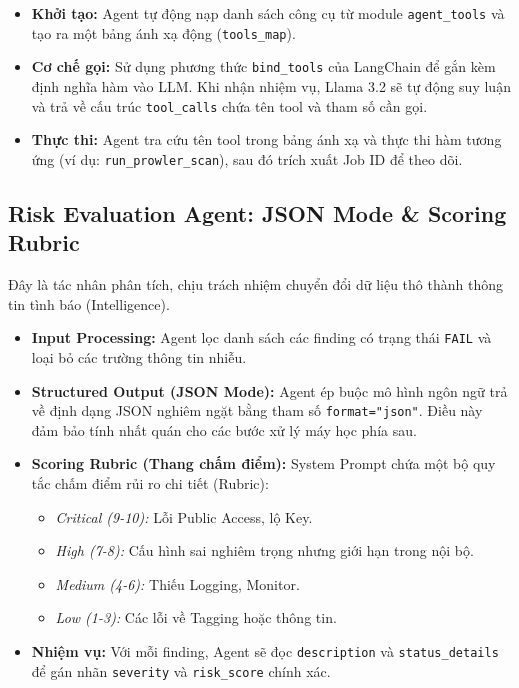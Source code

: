 \begin{itemize}
    \item \textbf{Khởi tạo:} Agent tự động nạp danh sách công cụ từ module \texttt{agent\_tools} và tạo ra một bảng ánh xạ động (\texttt{tools\_map}).
    \item \textbf{Cơ chế gọi:} Sử dụng phương thức \texttt{bind\_tools} của LangChain để gắn kèm định nghĩa hàm vào LLM. Khi nhận nhiệm vụ, Llama 3.2 sẽ tự động suy luận và trả về cấu trúc \texttt{tool\_calls} chứa tên tool và tham số cần gọi.
    \item \textbf{Thực thi:} Agent tra cứu tên tool trong bảng ánh xạ và thực thi hàm tương ứng (ví dụ: \texttt{run\_prowler\_scan}), sau đó trích xuất Job ID để theo dõi.
\end{itemize}

\subsection{Risk Evaluation Agent: JSON Mode \& Scoring Rubric}
Đây là tác nhân phân tích, chịu trách nhiệm chuyển đổi dữ liệu thô thành thông tin tình báo (Intelligence).

\begin{itemize}
    \item \textbf{Input Processing:} Agent lọc danh sách các finding có trạng thái \texttt{FAIL} và loại bỏ các trường thông tin nhiễu.
    \item \textbf{Structured Output (JSON Mode):} Agent ép buộc mô hình ngôn ngữ trả về định dạng JSON nghiêm ngặt bằng tham số \texttt{format="json"}. Điều này đảm bảo tính nhất quán cho các bước xử lý máy học phía sau.
    \item \textbf{Scoring Rubric (Thang chấm điểm):} System Prompt chứa một bộ quy tắc chấm điểm rủi ro chi tiết (Rubric):
    \begin{itemize}
        \item \textit{Critical (9-10):} Lỗi Public Access, lộ Key.
        \item \textit{High (7-8):} Cấu hình sai nghiêm trọng nhưng giới hạn trong nội bộ.
        \item \textit{Medium (4-6):} Thiếu Logging, Monitor.
        \item \textit{Low (1-3):} Các lỗi về Tagging hoặc thông tin.
    \end{itemize}
    \item \textbf{Nhiệm vụ:} Với mỗi finding, Agent sẽ đọc \texttt{description} và \texttt{status\_details} để gán nhãn \texttt{severity} và \texttt{risk\_score} chính xác.
\end{itemize}


